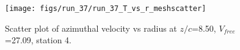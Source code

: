\begin{figure}[H]
\centering
\texttt{[image: figs/run\_37/run\_37\_T\_vs\_r\_meshscatter]}
\caption{Scatter plot of azimuthal velocity vs radius at $z/c$=8.50, $V_{free}$=27.09, station 4.}
\label{fig:run_37_T_vs_r_meshscatter}
\end{figure}



